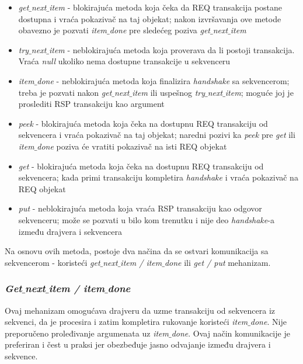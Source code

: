 \begin{itemize}
\item \emph{get\(\_\)next\(\_\)item} - blokirajuća metoda koja čeka da REQ transakcija postane dostupna i vraća pokazivač na taj objekat; nakon izvršavanja ove metode obavezno je pozvati \emph{item\(\_\)done} pre sledećeg poziva \emph{get\(\_\)next\(\_\)item}
\item \emph{try\(\_\)next\(\_\)item} - neblokirajuća metoda koja proverava da li
  postoji transakcija. Vraća \emph{null} ukoliko nema dostupne transakcije u
  sekvenceru
\item \emph{item\(\_\)done} - neblokirajuća metoda koja finalizira
  \emph{handshake} sa sekvencerom; treba je pozvati nakon
  \emph{get\(\_\)next\(\_\)item} ili uspešnog \emph{try\(\_\)next\(\_\)item};
  moguće joj je proslediti RSP transakciju kao argument
\item \emph{peek} - blokirajuća metoda koja čeka na dostupnu REQ transakciju od
  sekvencera i vraća pokazivač na taj objekat; naredni pozivi ka \emph{peek} pre
  \emph{get} ili \emph{item\(\_\)done} poziva će vratiti pokazivač na isti REQ
  objekat
\item \emph{get} - blokirajuća metoda koja čeka na dostupnu REQ transakciju od
  sekvencera; kada primi transakciju kompletira \emph{handshake} i vraća
  pokazivač na REQ objekat
\item \emph{put} - neblokirajuća metoda koja vraća RSP transakciju kao odgovor
  sekvenceru; može se pozvati u bilo kom trenutku i nije deo \emph{handshake}-a
  između drajvera i sekvencera
\end{itemize}

Na osnovu ovih metoda, postoje dva načina da se ostvari komunikacija sa
sekvencerom - koristeći \emph{get\(\_\)next\(\_\)item / item\(\_\)done} ili
\emph{get / put} mehanizam.

\subsubsection{\emph{Get\(\_\)next\(\_\)item / item\(\_\)done}}

Ovaj mehanizam omogućava drajveru da uzme transakciju od sekvencera iz sekvenci,
da je procesira i zatim kompletira rukovanje koristeći \emph{item\(\_\)done}.
Nije preporučeno proleđivanje argumenata uz \emph{item\(\_\)done}. Ovaj način
komunikacije je preferiran i čest u praksi jer obezbeđuje jasno odvajanje
između drajvera i sekvence.\\

